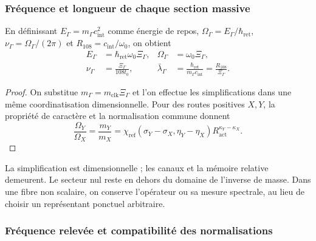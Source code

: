 \subsubsection{Fréquence et longueur de chaque section massive}
\label{md:hib:frecuencia-longitud}

En définissant $E_\Gamma=m_\Gamma c_{\mathrm{int}}^2$ comme énergie de repos,
$\Omega_\Gamma=E_\Gamma/\hbar_{\mathrm{ret}}$,
$\nu_\Gamma=\Omega_\Gamma/(2\pi)$ et
$R_{108}=c_{\mathrm{int}}/\omega_0$, on obtient
\begin{equation}
 \begin{aligned}
 E_\Gamma&=\hbar_{\mathrm{ret}}\omega_0\Xi_\Gamma,&
 \Omega_\Gamma&=\omega_0\Xi_\Gamma,\\
 \nu_\Gamma&=\frac{\Xi_\Gamma}{108t_0},&
 \bar\lambda_\Gamma&=
 \frac{\hbar_{\mathrm{ret}}}{m_\Gamma c_{\mathrm{int}}}
 =\frac{R_{108}}{\Xi_\Gamma}.
 \end{aligned}
 \label{md:hib:frecuencias}
\end{equation}
\begin{proof}
On substitue $m_\Gamma=m_{\mathrm{clk}}\Xi_\Gamma$ et l’on effectue les
simplifications dans une même coordinatisation dimensionnelle. Pour des routes positives $X,Y$,
la propriété de caractère et la normalisation commune donnent
\begin{equation}
 \frac{\Omega_Y}{\Omega_X}=\frac{m_Y}{m_X}
 =\chi_{\mathrm{ref}}(\sigma_Y-\sigma_X,\eta_Y-\eta_X)
 R_{\mathrm{act}}^{\kappa_Y-\kappa_X}.
 \label{md:hib:cocientes}
\end{equation}
\end{proof}
La simplification est dimensionnelle ; les canaux et la mémoire
relative demeurent. Le secteur nul reste en dehors du domaine de l’inverse de masse.
Dans une fibre non scalaire, on conserve l’opérateur ou sa mesure spectrale,
au lieu de choisir un représentant ponctuel arbitraire.

\subsubsection{Fréquence relevée et compatibilité des normalisations}
\label{md:hib:tres-frecuencias}

